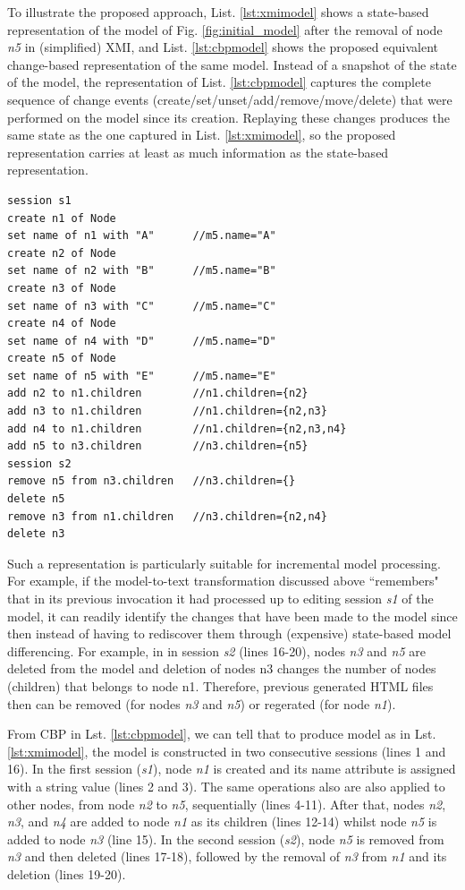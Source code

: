 \documentclass[sigconf]{acmart}
\begin{document}
To illustrate the proposed approach, List. \ref{lst:xmimodel} shows a state-based representation of the model of Fig. \ref{fig:initial_model} after the removal of node \emph{n5} in (simplified) XMI, and List. \ref{lst:cbpmodel} shows the proposed equivalent change-based representation of the same model. Instead of a snapshot of the state of the model, the representation of List. \ref{lst:cbpmodel} captures the complete sequence of change events (create/set/unset/add/remove/move/delete) that were performed on the model since its creation. Replaying these changes produces the same state as the one captured in List. \ref{lst:xmimodel}, so the proposed representation carries at least as much information as the state-based representation.

\begin{lstlisting}[style=eol,caption={Change-based representation of the model of Figure \ref{fig:initial_model} after removal of node \emph{n5}.},label=lst:cbpmodel]
session s1
create n1 of Node
set name of n1 with "A"      //m5.name="A"
create n2 of Node
set name of n2 with "B"      //m5.name="B"
create n3 of Node
set name of n3 with "C"      //m5.name="C"
create n4 of Node
set name of n4 with "D"      //m5.name="D"
create n5 of Node
set name of n5 with "E"      //m5.name="E"
add n2 to n1.children        //n1.children={n2}
add n3 to n1.children        //n1.children={n2,n3}
add n4 to n1.children        //n1.children={n2,n3,n4}
add n5 to n3.children        //n3.children={n5}
session s2
remove n5 from n3.children   //n3.children={}
delete n5 
remove n3 from n1.children   //n3.children={n2,n4}
delete n3
\end{lstlisting}

Such a representation is particularly suitable for incremental model processing. For example, if the model-to-text transformation discussed above ``remembers" that in its previous invocation it had processed up to editing session \emph{s1} of the model, it can readily identify the changes that have been made to the model since then instead of having to rediscover them through (expensive) state-based model differencing. For example, in in session \emph{s2} (lines 16-20), nodes \emph{n3} and \emph{n5} are deleted from the model and deletion of nodes n3 changes the number of nodes (children) that belongs to node {n1}. Therefore, previous generated HTML files then can be removed (for nodes \emph{n3} and \emph{n5}) or regerated (for node \emph{n1}). 

From CBP in Lst. \ref{lst:cbpmodel}, we can tell that to produce model as in Lst. \ref{lst:xmimodel}, the model is constructed in two consecutive sessions (lines 1 and 16). In the first session (\emph{s1}), node \emph{n1} is created and its name attribute is assigned with a string value (lines 2 and 3). The same operations also are also applied to other nodes, from node \emph{n2} to \emph{n5}, sequentially (lines 4-11). After that, nodes \emph{n2}, \emph{n3}, and \emph{n4} are added to node \emph{n1} as its children (lines 12-14) whilst node \emph{n5} is added to node \emph{n3} (line 15). In the second session (\emph{s2}), node \emph{n5} is removed from \emph{n3} and then deleted (lines 17-18), followed by the removal of \emph{n3} from \emph{n1} and its deletion (lines 19-20).
\end{document}
